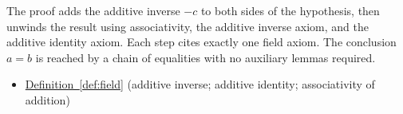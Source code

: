 \begin{remark*}
The proof adds the additive inverse $-c$ to both sides of the hypothesis,
then unwinds the result using associativity, the additive inverse axiom, and
the additive identity axiom.  Each step cites exactly one field axiom.  The
conclusion $a = b$ is reached by a chain of equalities with no auxiliary
lemmas required.
\end{remark*}

\begin{dependencies}
\begin{itemize}
  \item \hyperref[def:field]{Definition~\ref*{def:field}}
        \textnormal{(additive inverse; additive identity; associativity of addition)}
\end{itemize}
\end{dependencies}
